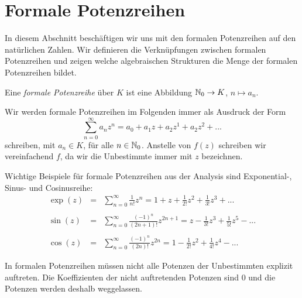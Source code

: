 \section{Formale Potenzreihen}\label{potenzreihenring}

%
In diesem Abschnitt beschäftigen wir uns mit den formalen Potenzreihen auf den natürlichen Zahlen. Wir definieren die Verknüpfungen zwischen formalen Potenzreihen und zeigen welche algebraischen Strukturen die Menge der formalen Potenzreihen bildet.
  
\begin{defn}
Eine \textit{formale Potenzreihe} über $K$ ist eine Abbildung $\mathbb{N}_0 \rightarrow K$, $n \mapsto a_n$.
\end{defn}
\begin{bemnota}
Wir werden formale Potenzreihen im Folgenden immer als Ausdruck der Form
\begin{equation}\label{eq: formalepotenzreihe}
\sum_{n=0}^\infty a_n z^n = a_0 + a_1z + a_2z^1 + a_2z^2 + ...
\end{equation}
schreiben, mit $a_n \in K$, für alle $n \in \mathbb{N}_0$.
Anstelle von $f(z)$ schreiben wir vereinfachend $f$, da wir die Unbestimmte immer mit $z$ bezeichnen.
\end{bemnota}
%
%
%
% 
%
%
%
\begin{bsp}
Wichtige Beispiele für formale Potenzreihen aus der Analysis sind Exponential-, Sinus- und Cosinusreihe:
\begin{eqnarray*}
\exp(z) &=& \sum_{n=0}^{\infty} \frac{1}{n!} z^n
= 1 + z +\frac{1}{2!} z^2 + \frac{1}{3!} z^3 + ... \\ \\
\sin(z) &=& \sum_{n= 0}^{\infty} \frac{\left(-1\right)^n}{\left(2n + 1\right)!} z^{2n+1} = z - \frac{1}{3!} z^3 + \frac{1}{5!} z^5 - ...\\\\
\cos(z) &=& \sum_{n= 0}^{\infty} \frac{\left(-1\right)^n}{\left(2n\right)!} z^{2n}
= 1 - \frac{1}{2!} z^2 + \frac{1}{4!} z^4 - ...
\end{eqnarray*}
\end{bsp}
%
\begin{bem}
In formalen Potenzreihen müssen nicht alle Potenzen der Unbestimmten explizit auftreten. Die Koeffizienten der nicht auftretenden Potenzen sind $0$ und die Potenzen werden deshalb weggelassen.
\end{bem}
%
